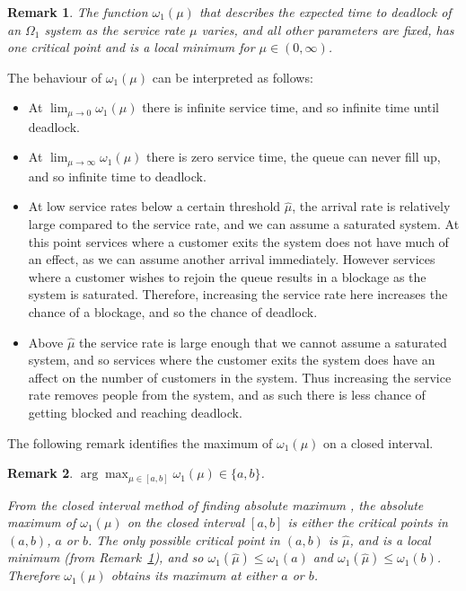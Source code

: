 \documentclass{article}
\newtheorem{remark}{Remark}
\numberwithin{equation}{section}
\begin{document}
\begin{remark}\label{rem:oneminima}
The function $\omega_1(\mu)$ that describes the expected time to deadlock of
an $\Omega_1$ system as the service rate $\mu$ varies, and all other
parameters are fixed, has one critical point and is a local minimum for
$\mu \in (0, \infty)$.
\end{remark}

The behaviour of $\omega_1(\mu)$ can be interpreted as follows:
\begin{itemize}
\item At $\lim_{\mu \to 0} \omega_1 (\mu)$ there is infinite service time,
and so infinite time until deadlock.
\item At $\lim_{\mu \to \infty} \omega_1 (\mu)$ there is zero service time,
the queue can never fill up, and so infinite time to deadlock.
\item At low service rates below a certain threshold $\hat{\mu}$, the arrival
rate is relatively large compared to the service rate, and we can assume a
saturated system.
At this point services where a customer exits the system does not have much of
an effect, as we can assume another arrival immediately.
However services where a customer wishes to rejoin the queue results in a
blockage as the system is saturated.
Therefore, increasing the service rate here increases the chance of a
blockage, and so the chance of deadlock.
\item Above $\hat{\mu}$ the service rate is large enough that we cannot assume
a saturated system, and so services where the customer exits the system does
have an affect on the number of customers in the system.
Thus increasing the service rate removes people from the system, and as such
there is less chance of getting blocked and reaching deadlock.
\end{itemize}

The following remark identifies the maximum of $\omega_1(\mu)$ on a closed
interval.\\

\begin{remark}\label{rem:findmaximum}
$\arg\max_{\mu \in [a, b]} \omega_1(\mu) \in \{a, b\}$.

From the closed interval method of finding absolute maximum \cite{tan09}, the
absolute maximum of $\omega_1(\mu)$ on the closed interval $[a, b]$ is either
the critical points in $(a, b)$, $a$ or $b$.
The only possible critical point in $(a, b)$ is $\hat{\mu}$, and is a local
minimum (from Remark~\ref{rem:oneminima}), and so
$\omega_1(\hat{\mu}) \leq \omega_1(a)$ and
$\omega_1(\hat{\mu}) \leq \omega_1(b)$.
Therefore $\omega_1(\mu)$ obtains its maximum at either $a$ or $b$.
\end{remark}
\end{document}
